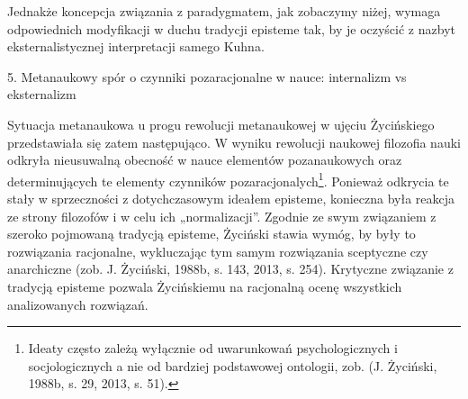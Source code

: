 \documentclass{article}
\begin{document}
Jednakże koncepcja związania z paradygmatem, jak zobaczymy niżej, wymaga odpowiednich modyfikacji w duchu tradycji
episteme tak, by je oczyścić z nazbyt eksternalistycznej interpretacji samego Kuhna.

5. Metanaukowy spór o czynniki pozaracjonalne w nauce: internalizm vs eksternalizm

Sytuacja metanaukowa u progu rewolucji metanaukowej w ujęciu Życińskiego przedstawiała się zatem następująco. W wyniku
rewolucji naukowej filozofia nauki odkryła nieusuwalną obecność w nauce elementów pozanaukowych oraz determinujących te
elementy czynników pozaracjonalych\footnote{Ideaty często zależą wyłącznie od uwarunkowań psychologicznych i
socjologicznych a nie od bardziej podstawowej ontologii, zob. \label{ref:RNDZ7VFgO3ocx}(J. Życiński, 1988b, s. 29,
2013, s. 51).}. Ponieważ odkrycia te stały w sprzeczności z dotychczasowym ideałem episteme, konieczna była reakcja ze
strony filozofów i w celu ich „normalizacji”. Zgodnie ze swym związaniem z szeroko pojmowaną tradycją episteme,
Życiński stawia wymóg, by były to rozwiązania racjonalne, wykluczając tym samym rozwiązania sceptyczne czy anarchiczne
\label{ref:RNDlHYNmrMqD0}(zob. J. Życiński, 1988b, s. 143, 2013, s. 254). Krytyczne związanie z tradycją episteme
pozwala Życińskiemu na racjonalną ocenę wszystkich analizowanych rozwiązań.
\end{document}
